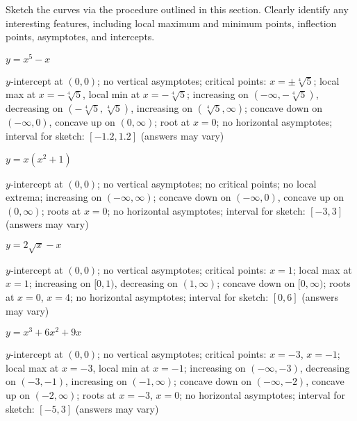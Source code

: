  
\begin{exercises}

\noindent Sketch the curves via the procedure outlined in this
section. Clearly identify any interesting features, including local
maximum and minimum points, inflection points, asymptotes, and
intercepts.

\twocol


\begin{exercise} $y= x^5 - x$
\begin{answer}
$y$-intercept at $(0,0)$; no vertical asymptotes; critical points:
  $x=\pm\sqrt[4]{5}$; local max at $x=-\sqrt[4]{5}$, local min at
  $x=-\sqrt[4]{5}$; increasing on $(-\infty,-\sqrt[4]{5})$, decreasing
  on $(-\sqrt[4]{5},\sqrt[4]{5})$, increasing on
  $(\sqrt[4]{5},\infty)$; concave down on $(-\infty,0)$, concave up on
  $(0, \infty)$; root at $x=0$; no horizontal asymptotes; interval for
  sketch: $[-1.2,1.2]$ (answers may vary)
\end{answer}
\end{exercise}

\begin{exercise} $y=x(x^2+1)$
\begin{answer}
$y$-intercept at $(0,0)$; no vertical asymptotes; no critical points;
  no local extrema; increasing on $(-\infty,\infty)$; concave down on
  $(-\infty,0)$, concave up on $(0, \infty)$; roots at $x=0$; no
  horizontal asymptotes; interval for sketch: $[-3,3]$ (answers may
  vary)
\end{answer}
\end{exercise}

\begin{exercise} $y=2\sqrt{x} - x$
\begin{answer}
$y$-intercept at $(0,0)$; no vertical asymptotes; critical points: $x=
  1$; local max at $x=1$; increasing on $[0,1)$, decreasing on
    $(1,\infty)$; concave down on $[0,\infty)$; roots at $x=0$, $x=4$;
      no horizontal asymptotes; interval for sketch: $[0,6]$ (answers
      may vary)
\end{answer}
\end{exercise}

\begin{exercise} $y=x^3+6x^2 + 9x$
\begin{answer}
$y$-intercept at $(0,0)$; no vertical asymptotes; critical points:
  $x=-3$, $x= -1$; local max at $x=-3$, local min at $x=-1$;
  increasing on $(-\infty,-3)$, decreasing on $(-3,-1)$, increasing on
  $(-1,\infty)$; concave down on $(-\infty,-2)$, concave up on $(-2,
  \infty)$; roots at $x=-3$, $x=0$; no horizontal asymptotes; interval
  for sketch: $[-5,3]$ (answers may vary)
\end{answer}
\end{exercise}


\end{exercises}
